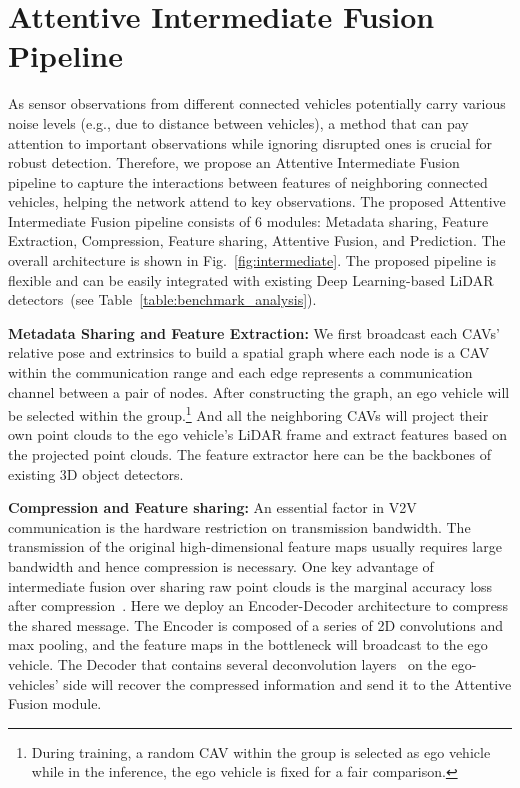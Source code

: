 \section{Attentive Intermediate Fusion Pipeline}
As sensor observations from different connected vehicles potentially carry various noise levels (e.g., due to distance between vehicles), a method that can pay attention to important observations while ignoring disrupted ones is crucial for robust detection. Therefore, we propose an Attentive Intermediate Fusion pipeline to capture the interactions between features of neighboring connected vehicles, helping the network attend to key observations. The proposed Attentive Intermediate Fusion pipeline consists of 6 modules: Metadata sharing, Feature Extraction, Compression, Feature sharing, Attentive Fusion, and Prediction. The overall architecture is shown in Fig.~\ref{fig:intermediate}. The proposed pipeline is flexible and can be easily integrated with existing Deep Learning-based LiDAR detectors~(see Table~\ref{table:benchmark_analysis}). 

\noindent\textbf{Metadata Sharing and Feature Extraction: }We first broadcast each CAVs' relative pose and extrinsics to build a spatial graph where each node is a CAV within the communication range and each edge represents a communication channel between a pair of nodes. After constructing the graph, an ego vehicle will be selected within the group.\footnote{During training, a random CAV within the group is selected as ego vehicle while in the inference, the ego vehicle is fixed for a fair comparison.} And all the neighboring  CAVs will project their own point clouds to the ego vehicle's LiDAR frame and extract features based on the projected point clouds. The feature extractor here can be the backbones of existing 3D object detectors.

\noindent\textbf{Compression and Feature sharing: }An essential factor in V2V communication is the hardware restriction on transmission bandwidth. The transmission of the original high-dimensional feature maps usually requires large bandwidth and hence compression is necessary.  One key advantage of intermediate fusion over sharing raw point clouds is the marginal accuracy loss after compression~\cite{Wang2020V2VNetVC}. Here we deploy an Encoder-Decoder architecture to compress the shared message. The Encoder is composed of a series of 2D convolutions and max pooling, and the feature maps in the bottleneck will broadcast to the ego vehicle. The Decoder that contains several deconvolution layers~\cite{noh2015learning} on the ego-vehicles' side will recover the compressed information and send it to the Attentive Fusion module. 

